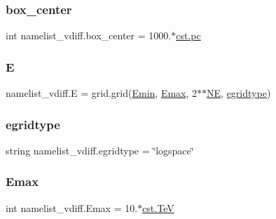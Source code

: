 \subsubsection{\texorpdfstring{box\+\_\+center}{box\_center}}
{\footnotesize\ttfamily int namelist\+\_\+vdiff.\+box\+\_\+center = 1000.$\ast$\hyperlink{constants_8h_a2884cd030c4c825754349a525a1d06ce}{cst.\+pc}}

\mbox{\label{namespacenamelist__vdiff_a14d10524740626b739dfa5d08bc60e53}} 
\subsubsection{\texorpdfstring{E}{E}}
{\footnotesize\ttfamily namelist\+\_\+vdiff.\+E = grid.\+grid(\hyperlink{namespacenamelist__vdiff_a35d8a695963d790f4b41bc64e5fc2e79}{Emin}, \hyperlink{namespacenamelist__vdiff_a1d11027ceca7080d56390756c58de24a}{Emax}, 2$\ast$$\ast$\hyperlink{namespacenamelist__vdiff_a35160199f7eeb6d25fdf0832dbebf373}{NE}, \hyperlink{namespacenamelist__vdiff_acec5111fb715636887d0bbfd3d160269}{egridtype})}

\mbox{\label{namespacenamelist__vdiff_acec5111fb715636887d0bbfd3d160269}} 
\subsubsection{\texorpdfstring{egridtype}{egridtype}}
{\footnotesize\ttfamily string namelist\+\_\+vdiff.\+egridtype = \char`\"{}logspace\char`\"{}}

\mbox{\label{namespacenamelist__vdiff_a1d11027ceca7080d56390756c58de24a}} 
\subsubsection{\texorpdfstring{Emax}{Emax}}
{\footnotesize\ttfamily int namelist\+\_\+vdiff.\+Emax = 10.$\ast$\hyperlink{constants_8h_a7f801e1f6821bc6baf0652ed2496e5e9}{cst.\+TeV}}

\mbox{\label{namespacenamelist__vdiff_a35d8a695963d790f4b41bc64e5fc2e79}} 
